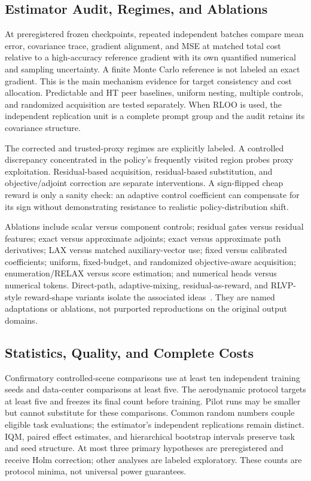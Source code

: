 \subsection{Estimator Audit, Regimes, and Ablations}
At preregistered frozen checkpoints, repeated independent batches compare mean error, covariance trace, gradient alignment, and MSE at matched total cost relative to a high-accuracy reference gradient with its own quantified numerical and sampling uncertainty. A finite Monte Carlo reference is not labeled an exact gradient. This is the main mechanism evidence for target consistency and cost allocation. Predictable and HT peer baselines, uniform nesting, multiple controls, and randomized acquisition are tested separately. When RLOO is used, the independent replication unit is a complete prompt group and the audit retains its covariance structure.

The corrected and trusted-proxy regimes are explicitly labeled. A controlled discrepancy concentrated in the policy's frequently visited region probes proxy exploitation. Residual-based acquisition, residual-based substitution, and objective/adjoint correction are separate interventions. A sign-flipped cheap reward is only a sanity check: an adaptive control coefficient can compensate for its sign without demonstrating resistance to realistic policy-distribution shift.

Ablations include scalar versus component controls; residual gates versus residual features; exact versus approximate adjoints; exact versus approximate path derivatives; LAX versus matched auxiliary-vector use; fixed versus calibrated coefficients; uniform, fixed-budget, and randomized objective-aware acquisition; enumeration/RELAX versus score estimation; and numerical heads versus numerical tokens. Direct-path, adaptive-mixing, residual-as-reward, and RLVP-style reward-shape variants isolate the associated ideas~\cite{nel2025grade,son2023gippo,yuan2025pirf,cai2026rlvp}. They are named adaptations or ablations, not purported reproductions on the original output domains.

\subsection{Statistics, Quality, and Complete Costs}
Confirmatory controlled-scene comparisons use at least ten independent training seeds and data-center comparisons at least five. The aerodynamic protocol targets at least five and freezes its final count before training. Pilot runs may be smaller but cannot substitute for these comparisons. Common random numbers couple eligible task evaluations; the estimator's independent replications remain distinct. IQM, paired effect estimates, and hierarchical bootstrap intervals preserve task and seed structure. At most three primary hypotheses are preregistered and receive Holm correction; other analyses are labeled exploratory. These counts are protocol minima, not universal power guarantees.

